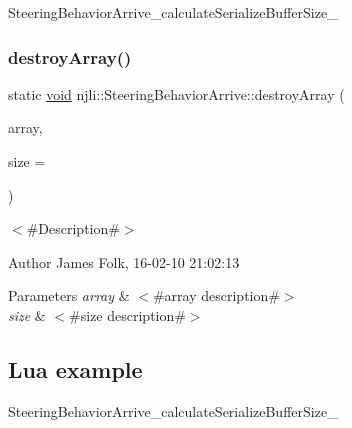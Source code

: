 \begin{DoxyCodeInclude}
\end{DoxyCodeInclude}
Steering\+Behavior\+Arrive\+\_\+calculate\+Serialize\+Buffer\+Size\+\_\+ \mbox{\label{classnjli_1_1_steering_behavior_arrive_ad5836ab023df75e4accd4700f4e7a4bc}} 
\subsubsection{\texorpdfstring{destroy\+Array()}{destroyArray()}}
{\footnotesize\ttfamily static \mbox{\hyperlink{_thread_8h_af1e856da2e658414cb2456cb6f7ebc66}{void}} njli\+::\+Steering\+Behavior\+Arrive\+::destroy\+Array (\begin{DoxyParamCaption}\item[{\mbox{\hyperlink{classnjli_1_1_steering_behavior_arrive}{Steering\+Behavior\+Arrive}} $\ast$$\ast$}]{array,  }\item[{const \mbox{\hyperlink{_util_8h_a10e94b422ef0c20dcdec20d31a1f5049}{u32}}}]{size = {} }\end{DoxyParamCaption})\hspace{0.3cm}{\ttfamily [static]}}



$<$\#\+Description\#$>$ 

\begin{DoxyAuthor}{Author}
James Folk, 16-\/02-\/10 21\+:02\+:13
\end{DoxyAuthor}

\begin{DoxyParams}{Parameters}
{\em array} & $<$\#array description\#$>$ \\
\hline
{\em size} & $<$\#size description\#$>$\\
\hline
\end{DoxyParams}
\hypertarget{classnjli_1_1_steering_behavior_wander_ex1}{}\subsection{Lua example}\label{classnjli_1_1_steering_behavior_wander_ex1}

\begin{DoxyCodeInclude}
\end{DoxyCodeInclude}
Steering\+Behavior\+Arrive\+\_\+calculate\+Serialize\+Buffer\+Size\+\_\+ \mbox{\label{classnjli_1_1_steering_behavior_arrive_a49def442c41437419d4b1934528e6d12}} 
